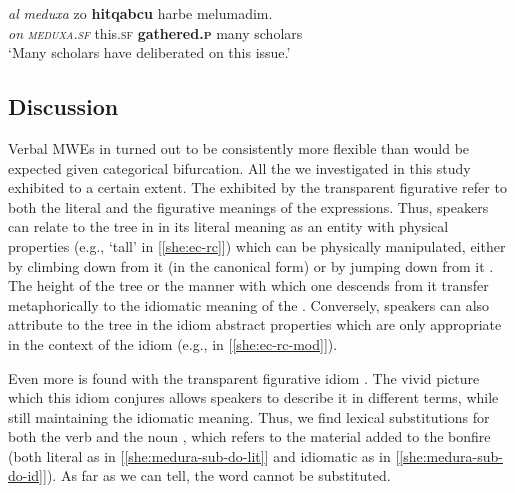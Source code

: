 \documentclass[output=paper]{langsci/langscibook}
\begin{document}
    \ea\label{she:meduxa-sub}
         \gll \textit{{\ayin}al} \textit{meduxa} zo \textbf{hitqabcu} harbe melumadim.\\
             \textit{on} \textit{\textsc{meduxa}.\textsc{sf}} this.\textsc{sf}  \textbf{gathered.\textsc{p}} many scholars\\
        \glt `Many scholars have deliberated on this issue.'
    \z


\subsection{Discussion}

Verbal MWEs in  turned out to be consistently more flexible than would be expected given  categorical bifurcation. All the  we investigated in this study exhibited  to a certain extent. The  exhibited by the transparent figurative  refer to both the literal and the figurative meanings of the expressions. Thus, speakers can relate to the tree in  in its literal meaning as an entity with physical properties (e.g., `tall' in [\ref{she:ec-rc}]) which can be physically manipulated, either by climbing down from it (in the canonical form) or by jumping down from it . The height of the tree or the manner with which one descends  from it transfer metaphorically to the idiomatic meaning of the . Conversely, speakers can also attribute to the tree in the idiom abstract properties which are only appropriate in the context of the idiom (e.g.,  in [\ref{she:ec-rc-mod}]).

Even more  is found with the transparent figurative idiom . The vivid picture which this idiom conjures allows speakers to describe it in different terms, while still maintaining the idiomatic meaning. Thus, we find lexical substitutions for both the verb  and the noun , which refers to the material added to the bonfire (both literal as in [\ref{she:medura-sub-do-lit}] and idiomatic as in [\ref{she:medura-sub-do-id}]). As far as we can tell, the word  cannot be substituted.
\end{document}
